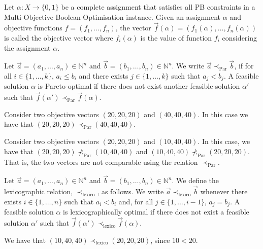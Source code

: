 \documentclass[a4paper,UKenglish,cleveref, autoref, thm-restate]{lipics-v2021}
\begin{document}
\begin{definition}
Let $\alpha: X \rightarrow \lbrace 0, 1 \rbrace$ be a complete assignment that 
satisfies all PB constraints in a Multi-Objective Boolean Optimisation instance.
Given an assignment $\alpha$ and objective functions $f = (f_1, \dots, f_n)$, the vector $\vec{f}(\alpha)=(f_1(\alpha),\dots,f_n(\alpha))$ is called the objective vector where $f_i(\alpha)$ is the value of function $f_i$ considering the
assignment $\alpha$.
\end{definition}

\begin{definition}
Let $\vec{a}=(a_1,\dots,a_n)\in \mathbb{N}^n$ and $\vec{b}=(b_1,\dots,b_n)\in \mathbb{N}^n$. We write $\vec{a} \prec_{\text{Par}} \vec{b}$, if for all $i \in \{1,\dots,k\}$, $a_i\leq b_i$ and there exists $j\in \{1,\dots,k\}$ such that $a_j < b_j$. A feasible solution $\alpha$ is Pareto-optimal if there does not exist another feasible solution $\alpha'$ such that $\vec{f}(\alpha') \prec_{\text{Par}} \vec{f}(\alpha)$.
\end{definition}

\begin{example}
Consider two objective vectors $(20,20,20)$ and $(40,40,40)$. In this case we have 
that $(20,20,20) \prec_{\text{Par}} (40,40,40)$.
\end{example}

\begin{example}
Consider two objective vectors $(20,20,20)$ and $(10,40,40)$. In this case, we have that $(20,20,20) \not\prec_{\text{Par}} (10,40,40)$ and $(10,40,40) \not\prec_{\text{Par}} (20,20,20)$.
That is, the two vectors are not comparable using the relation $\prec_{\text{Par}}$.
\end{example}

\begin{definition}
Let $\vec{a}=(a_1,\dots,a_n)\in \mathbb{N}^n$ and $\vec{b}=(b_1,\dots,b_n)\in \mathbb{N}^n$. We define the lexicographic relation, $\prec_{\text{lexico}}$, as follows. We write $\vec{a}\prec_{\text{lexico}}\vec{b}$ whenever there exists $i\in\{1,\dots,n\}$ such that $a_i<b_i$ and, for all $j\in \{1,\dots,i-1 \}$, $a_j=b_j$. A feasible solution $\alpha$ is lexicographically optimal if there does not exist a feasible solution $\alpha'$ such that $\vec{f}(\alpha')\prec_{\text{lexico}}\vec{f}(\alpha)$.
\end{definition}

\begin{example}
We have that $(10,40,40) \prec_{\text{lexico}} (20,20,20)$, since $10 < 20$.
\end{example}
\end{document}
